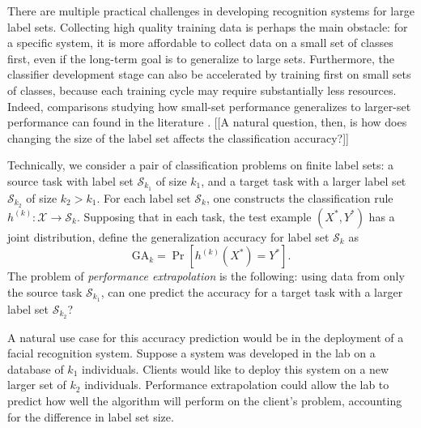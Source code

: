 \documentclass[twoside,11pt]{article}
\begin{document}
There are multiple practical challenges in developing recognition systems for large label sets. Collecting high quality training data is perhaps the main obstacle: for a specific system, it is more affordable to collect data on a small set of classes first, even if the long-term goal is to generalize to large sets. 
Furthermore, the classifier development stage can also be accelerated by training first on small sets of classes, because each training cycle may require substantially less resources. 
Indeed, comparisons studying how small-set performance generalizes to larger-set performance can found in the literature \citep{oquab2014learning, griffin2007caltech}.
[[A natural question, then, is how does changing the size of the label set affects the classification accuracy?]]

Technically, we consider a pair of classification
problems on finite label sets: a source task with label set $\mathcal{S}_{k_1}$ of size $k_1$, and a target task with a larger label set $\mathcal{S}_{k_2}$ of size $k_2 > k_1$.
For each label set $\mathcal{S}_k$, one constructs the classification rule
$h^{(k)}:\mathcal{X} \to \mathcal{S}_{k}$.  Supposing that in each task, the test example $(X^*, Y^*)$ has
a joint distribution, define the generalization accuracy for label set $\mathcal{S}_k$ as
\begin{equation}\label{eq:ga_k}
\text{GA}_k = \Pr[h^{(k)}(X^*) = Y^*].
\end{equation}
The problem of \emph{performance extrapolation} is the following: using data
from only the source task $\mathcal{S}_{k_1}$, can one predict the accuracy  for a target task with a larger label set $\mathcal{S}_{k_2}$?

A natural use case for this accuracy prediction would be in the deployment of a facial recognition system. 
Suppose a system was developed in the lab on a database of $k_1$ individuals. Clients would like to deploy this system on a new larger set of $k_2$ individuals. Performance extrapolation could allow the lab to predict how well the algorithm will perform on the client's problem, accounting for the difference in label set size.
\end{document}
